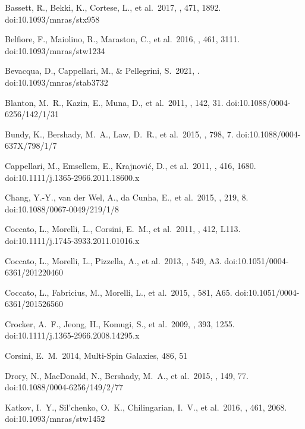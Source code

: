 \documentclass{aastex631}
\begin{document}
\begin{thebibliography}{}

 Bassett, R., Bekki, K., Cortese, L., et al.\ 2017, \mnras, 471, 1892. doi:10.1093/mnras/stx958

 Belfiore, F., Maiolino, R., Maraston, C., et al.\ 2016, \mnras, 461, 3111. doi:10.1093/mnras/stw1234

 Bevacqua, D., Cappellari, M., \& Pellegrini, S.\ 2021, \mnras. doi:10.1093/mnras/stab3732

 Blanton, M.~R., Kazin, E., Muna, D., et al.\ 2011, \aj, 142, 31. doi:10.1088/0004-6256/142/1/31

 Bundy, K., Bershady, M.~A., Law, D.~R., et al.\ 2015, \apj, 798, 7. doi:10.1088/0004-637X/798/1/7

 Cappellari, M., Emsellem, E., Krajnovi{\'c}, D., et al.\ 2011, \mnras, 416, 1680. doi:10.1111/j.1365-2966.2011.18600.x

 Chang, Y.-Y., van der Wel, A., da Cunha, E., et al.\ 2015, \apjs, 219, 8. doi:10.1088/0067-0049/219/1/8

 Coccato, L., Morelli, L., Corsini, E.~M., et al.\ 2011, \mnras, 412, L113. doi:10.1111/j.1745-3933.2011.01016.x

 Coccato, L., Morelli, L., Pizzella, A., et al.\ 2013, \aap, 549, A3. doi:10.1051/0004-6361/201220460

 Coccato, L., Fabricius, M., Morelli, L., et al.\ 2015, \aap, 581, A65. doi:10.1051/0004-6361/201526560

 Crocker, A.~F., Jeong, H., Komugi, S., et al.\ 2009, \mnras, 393, 1255. doi:10.1111/j.1365-2966.2008.14295.x

 Corsini, E.~M.\ 2014, Multi-Spin Galaxies, 486, 51

 Drory, N., MacDonald, N., Bershady, M.~A., et al.\ 2015, \aj, 149, 77. doi:10.1088/0004-6256/149/2/77

 Katkov, I.~Y., Sil'chenko, O.~K., Chilingarian, I.~V., et al.\ 2016, \mnras, 461, 2068. doi:10.1093/mnras/stw1452


\end{thebibliography}
\end{document}
